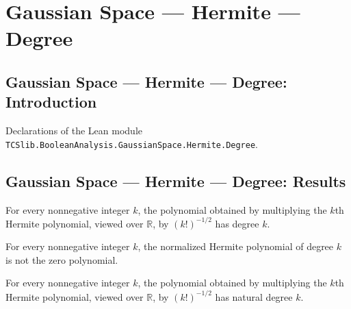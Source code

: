 \section{Gaussian Space --- Hermite --- Degree}
\subsection*{Gaussian Space --- Hermite --- Degree: Introduction}

Declarations of the Lean module \texttt{TCSlib.BooleanAnalysis.GaussianSpace.Hermite.Degree}.

\subsection*{Gaussian Space --- Hermite --- Degree: Results}

\begin{theorem}
\label{BooleanAnalysis.GaussianSpace.normalizedHermitePolynomial_degree}
\leanok
{}
For every nonnegative integer $k$, the polynomial obtained by multiplying the $k$th
Hermite polynomial, viewed over $\mathbb R$, by $(k!)^{-1/2}$ has degree $k$.
\end{theorem}

\begin{theorem}
\label{BooleanAnalysis.GaussianSpace.normalizedHermitePolynomial_ne_zero}
\leanok
{}
For every nonnegative integer $k$, the normalized Hermite polynomial of degree $k$ is
not the zero polynomial.
\end{theorem}

\begin{theorem}
\label{BooleanAnalysis.GaussianSpace.normalizedHermitePolynomial_natDegree}
\leanok
{}
For every nonnegative integer $k$, the polynomial obtained by multiplying the $k$th
Hermite polynomial, viewed over $\mathbb R$, by $(k!)^{-1/2}$ has natural degree $k$.
\end{theorem}

